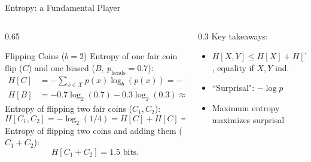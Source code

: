 \documentclass[10pt, aspectratio=169]{beamer}
\begin{document}
\begin{frame}{Entropy: a Fundamental Player}

\begin{columns}
	\begin{column}{0.65\textwidth}
	\begin{exampleblock}{Flipping Coins ($b=2$)}
		Entropy of one fair coin flip ($C$) and one biased ($B,~p_\text{heads}=0.7$):
	\pause
	\begin{align}
		H[C] &= -\sum_{x \in \mathcal{X}} p(x) \log_b(p(x)) = -\log_2(1 / 2) = 1 \text{ bit.} \\
		H[B] &= -0.7\log_2(0.7) -0.3\log_2(0.3) \approx 0.88 \text{ bits.}
	\end{align}
	\pause
		Entropy of flipping two fair coins ($C_1, C_2$):
	\begin{equation}
		H[C_1, C_2] = -\log_2(1 / 4) = H[C] + H[C] = 2 \text{ bits.}
	\end{equation}
	\pause
		Entropy of flipping two coins and adding them ($C_1+C_2$):
	\begin{equation}
		H[C_1+C_2] = 1.5 \text{ bits.}
	\end{equation}
\end{exampleblock}
	\end{column}
	\hfill
	\pause
	\begin{column}{0.3\textwidth}
		Key takeaways:
		\vspace{10pt}
		\begin{itemize}\addtolength{\itemsep}{10pt}
			\item $H[X, Y] \le H[X] + H[Y]$, equality if $X, Y$ ind.
			\item ``Surprisal": $-\log p$
			\item \textcolor{red!80!black}{Maximum entropy maximizes surprisal}
		\end{itemize}
	\end{column}
\end{columns}


\end{frame}
\end{document}
